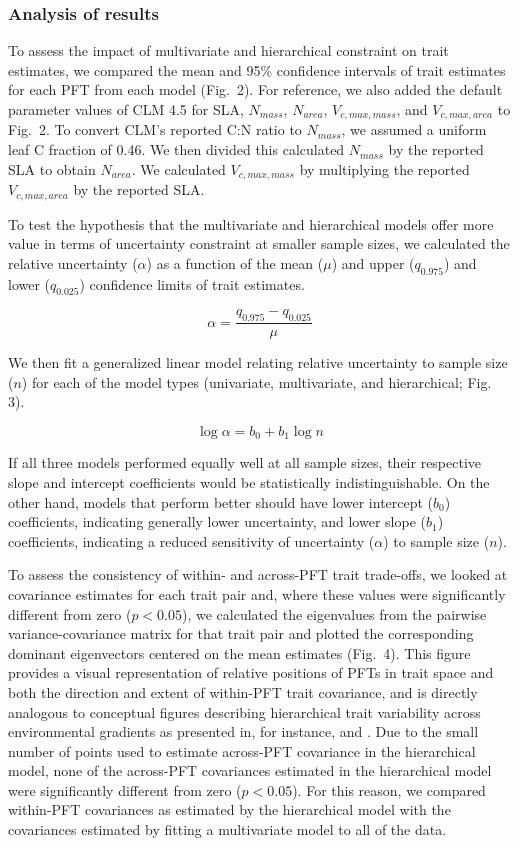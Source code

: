 \subsubsection{Analysis of results}

To assess the impact of multivariate and hierarchical constraint on trait estimates,
we compared the mean and 95\% confidence intervals of trait estimates for each PFT from each model (Fig.\ 2).
For reference, we also added the default parameter values of CLM 4.5 \cite[Table 8.1 in ]{clm45_note} for SLA, $N_{mass}$, $N_{area}$, $V_{c,max,mass}$, and $V_{c,max,area}$ to Fig.\ 2.
To convert CLM's reported C:N ratio to $N_{mass}$, we assumed a uniform leaf C fraction of 0.46.
We then divided this calculated $N_{mass}$ by the reported SLA to obtain $N_{area}$.
We calculated $V_{c,max,mass}$ by multiplying the reported $V_{c,max,area}$ by the reported SLA.

To test the hypothesis that the multivariate and hierarchical models offer more value in terms of uncertainty constraint at smaller sample sizes, we calculated the relative uncertainty ($\alpha$) as a function of the mean ($\mu$) and upper ($q_{0.975}$) and lower ($q_{0.025}$) confidence limits of trait estimates.

$$ \alpha = \frac{q_{0.975} - q_{0.025}}{\mu} $$

We then fit a generalized linear model relating relative uncertainty to sample size ($n$) for each of the model types (univariate, multivariate, and hierarchical; Fig. 3).

$$ \log{\alpha} = b_0 + b_1 \log{n} $$

If all three models performed equally well at all sample sizes, their respective slope and intercept coefficients would be statistically indistinguishable.
On the other hand, models that perform better should have
lower intercept ($b_0$) coefficients, indicating generally lower uncertainty,
and
lower slope ($b_1$) coefficients, indicating a reduced sensitivity of uncertainty ($\alpha$) to sample size ($n$).

To assess the consistency of within- and across-PFT trait trade-offs, we looked at covariance estimates for each trait pair and, where these values were significantly different from zero ($p < 0.05$),
we calculated the eigenvalues from the pairwise variance-covariance matrix for that trait pair and plotted the corresponding dominant eigenvectors centered on the mean estimates (Fig.\ 4).
This figure provides a visual representation of relative positions of PFTs in trait space and both the direction and extent of within-PFT trait covariance, and is directly analogous to conceptual figures describing hierarchical trait variability across environmental gradients as presented in, for instance, \cite{cornwell_community_2009} and \cite{albert_intraspecific_2010}.
Due to the small number of points used to estimate across-PFT covariance in the hierarchical model, none of the across-PFT covariances estimated in the hierarchical model were significantly different from zero ($p < 0.05$).
For this reason, we compared within-PFT covariances as estimated by the hierarchical model with the covariances estimated by fitting a multivariate model to all of the data.

